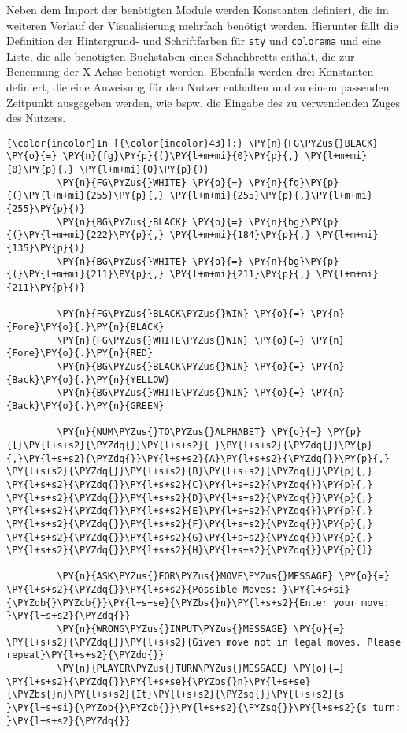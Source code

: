     Neben dem Import der benötigten Module werden Konstanten definiert, die
im weiteren Verlauf der Visualisierung mehrfach benötigt werden.
Hierunter fällt die Definition der Hintergrund- und Schriftfarben für
\texttt{sty} und \texttt{colorama} und eine Liste, die alle benötigten
Buchstaben eines Schachbretts enthält, die zur Benennung der X-Achse
benötigt werden. Ebenfalls werden drei Konstanten definiert, die eine
Anweisung für den Nutzer enthalten und zu einem passenden Zeitpunkt
ausgegeben werden, wie bspw. die Eingabe des zu verwendenden Zuges des
Nutzers.

    \begin{Verbatim}[commandchars=\\\{\}]
{\color{incolor}In [{\color{incolor}43}]:} \PY{n}{FG\PYZus{}BLACK} \PY{o}{=} \PY{n}{fg}\PY{p}{(}\PY{l+m+mi}{0}\PY{p}{,} \PY{l+m+mi}{0}\PY{p}{,} \PY{l+m+mi}{0}\PY{p}{)}
         \PY{n}{FG\PYZus{}WHITE} \PY{o}{=} \PY{n}{fg}\PY{p}{(}\PY{l+m+mi}{255}\PY{p}{,} \PY{l+m+mi}{255}\PY{p}{,}\PY{l+m+mi}{255}\PY{p}{)}
         \PY{n}{BG\PYZus{}BLACK} \PY{o}{=} \PY{n}{bg}\PY{p}{(}\PY{l+m+mi}{222}\PY{p}{,} \PY{l+m+mi}{184}\PY{p}{,} \PY{l+m+mi}{135}\PY{p}{)}
         \PY{n}{BG\PYZus{}WHITE} \PY{o}{=} \PY{n}{bg}\PY{p}{(}\PY{l+m+mi}{211}\PY{p}{,} \PY{l+m+mi}{211}\PY{p}{,} \PY{l+m+mi}{211}\PY{p}{)}
         
         \PY{n}{FG\PYZus{}BLACK\PYZus{}WIN} \PY{o}{=} \PY{n}{Fore}\PY{o}{.}\PY{n}{BLACK}
         \PY{n}{FG\PYZus{}WHITE\PYZus{}WIN} \PY{o}{=} \PY{n}{Fore}\PY{o}{.}\PY{n}{RED}
         \PY{n}{BG\PYZus{}BLACK\PYZus{}WIN} \PY{o}{=} \PY{n}{Back}\PY{o}{.}\PY{n}{YELLOW}
         \PY{n}{BG\PYZus{}WHITE\PYZus{}WIN} \PY{o}{=} \PY{n}{Back}\PY{o}{.}\PY{n}{GREEN}
         
         \PY{n}{NUM\PYZus{}TO\PYZus{}ALPHABET} \PY{o}{=} \PY{p}{[}\PY{l+s+s2}{\PYZdq{}}\PY{l+s+s2}{ }\PY{l+s+s2}{\PYZdq{}}\PY{p}{,}\PY{l+s+s2}{\PYZdq{}}\PY{l+s+s2}{A}\PY{l+s+s2}{\PYZdq{}}\PY{p}{,} \PY{l+s+s2}{\PYZdq{}}\PY{l+s+s2}{B}\PY{l+s+s2}{\PYZdq{}}\PY{p}{,} \PY{l+s+s2}{\PYZdq{}}\PY{l+s+s2}{C}\PY{l+s+s2}{\PYZdq{}}\PY{p}{,} \PY{l+s+s2}{\PYZdq{}}\PY{l+s+s2}{D}\PY{l+s+s2}{\PYZdq{}}\PY{p}{,} \PY{l+s+s2}{\PYZdq{}}\PY{l+s+s2}{E}\PY{l+s+s2}{\PYZdq{}}\PY{p}{,} \PY{l+s+s2}{\PYZdq{}}\PY{l+s+s2}{F}\PY{l+s+s2}{\PYZdq{}}\PY{p}{,} \PY{l+s+s2}{\PYZdq{}}\PY{l+s+s2}{G}\PY{l+s+s2}{\PYZdq{}}\PY{p}{,} \PY{l+s+s2}{\PYZdq{}}\PY{l+s+s2}{H}\PY{l+s+s2}{\PYZdq{}}\PY{p}{]}
         
         \PY{n}{ASK\PYZus{}FOR\PYZus{}MOVE\PYZus{}MESSAGE} \PY{o}{=} \PY{l+s+s2}{\PYZdq{}}\PY{l+s+s2}{Possible Moves: }\PY{l+s+si}{\PYZob{}\PYZcb{}}\PY{l+s+se}{\PYZbs{}n}\PY{l+s+s2}{Enter your move: }\PY{l+s+s2}{\PYZdq{}}
         \PY{n}{WRONG\PYZus{}INPUT\PYZus{}MESSAGE} \PY{o}{=} \PY{l+s+s2}{\PYZdq{}}\PY{l+s+s2}{Given move not in legal moves. Please repeat}\PY{l+s+s2}{\PYZdq{}}
         \PY{n}{PLAYER\PYZus{}TURN\PYZus{}MESSAGE} \PY{o}{=} \PY{l+s+s2}{\PYZdq{}}\PY{l+s+se}{\PYZbs{}n}\PY{l+s+se}{\PYZbs{}n}\PY{l+s+s2}{It}\PY{l+s+s2}{\PYZsq{}}\PY{l+s+s2}{s }\PY{l+s+si}{\PYZob{}\PYZcb{}}\PY{l+s+s2}{\PYZsq{}}\PY{l+s+s2}{s turn: }\PY{l+s+s2}{\PYZdq{}}
\end{Verbatim}

